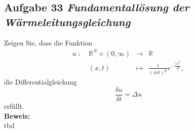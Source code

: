 \subsection*{Aufgabe 33 \mdseries\itshape Fundamentallösung der Wärmeleitungsgleichung}

   Zeigen Sie, dass die Funktion
   $$\begin{array}{crcl}
      u \; : \;& \mathbb{R}^N \times (0,\infty) &\rightarrow& \mathbb{R}\\
      & (x,t) & \mapsto & \frac{1}{(4\pi t)^{\frac{n}{2}}}e^{-\frac{|x|^2}{4t}},
   \end{array}$$
   die Differentialgleichung
   $$
      \frac{\delta u}{\delta t} = \Delta u
   $$
   erfüllt.\\

\textbf{Beweis:}\\
   tbd
